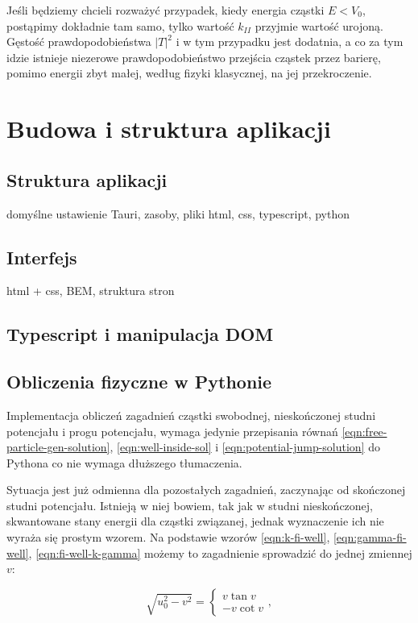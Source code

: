 \documentclass{SGGW-thesis}
\begin{document}
	Jeśli będziemy chcieli rozważyć przypadek, kiedy energia cząstki $E < V_0$, postąpimy dokładnie tam samo, tylko wartość $k_{II}$ przyjmie wartość urojoną. Gęstość prawdopodobieństwa $|T|^2$ i w tym przypadku jest dodatnia, a co za tym idzie istnieje niezerowe prawdopodobieństwo przejścia cząstek przez barierę, pomimo energii zbyt małej, według fizyki klasycznej, na jej przekroczenie.
	
	
\chapter{Budowa i struktura aplikacji}
	\section{Struktura aplikacji}
	domyślne ustawienie Tauri, zasoby, pliki html, css, typescript, python
	\section{Interfejs}
	html + css, BEM, struktura stron
	\section{Typescript i manipulacja DOM}
	\section{Obliczenia fizyczne w Pythonie}
		Implementacja obliczeń zagadnień cząstki swobodnej, nieskończonej studni potencjału i progu potencjału, wymaga jedynie przepisania równań \ref{eqn:free-particle-gen-solution}, \ref{eqn:well-inside-sol} i \ref{eqn:potential-jump-solution} do Pythona co nie wymaga dłuższego tłumaczenia.
		
		Sytuacja jest już odmienna dla pozostałych zagadnień, zaczynając od skończonej studni potencjału. Istnieją w niej bowiem, tak jak w studni nieskończonej, skwantowane stany energii dla cząstki związanej, jednak wyznaczenie ich nie wyraża się prostym wzorem. Na podstawie wzorów \ref{eqn:k-fi-well}, \ref{eqn:gamma-fi-well}, \ref{eqn:fi-well-k-gamma} możemy to zagadnienie sprowadzić do jednej zmiennej $v$\cite{wikipedia-well}:
		
		\begin{equation}\label{eqn:fi-well-vu}
			\sqrt{u_0^2-v^2} = 
			\left\{
		\begin{matrix}
			v\tan v \\ -v\cot v 
		\end{matrix}\right. ,
		\end{equation}
		
\end{document}
